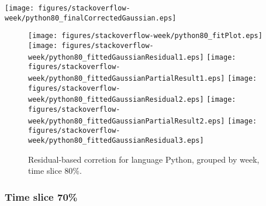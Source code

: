 \begin{center}
{\texttt{[image: figures/stackoverflow-week/python80\_finalCorrectedGaussian.eps]}}
\end{center}

\FloatBarrier

\begin{figure}[t]
\centering
{}
{\texttt{[image: figures/stackoverflow-week/python80\_fitPlot.eps]}}
{\texttt{[image: figures/stackoverflow-week/python80\_fittedGaussianResidual1.eps]}}
{\texttt{[image: figures/stackoverflow-week/python80\_fittedGaussianPartialResult1.eps]}}
{\texttt{[image: figures/stackoverflow-week/python80\_fittedGaussianResidual2.eps]}}
{\texttt{[image: figures/stackoverflow-week/python80\_fittedGaussianPartialResult2.eps]}}
{\texttt{[image: figures/stackoverflow-week/python80\_fittedGaussianResidual3.eps]}}
\caption{Residual-based corretion for language Python, grouped by week, time slice 80\%.}
\end{figure}


\FloatBarrier


\subsubsection{Time slice 70\%}

